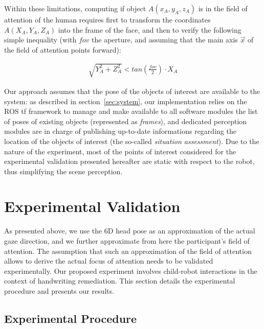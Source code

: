 \documentclass{sig-alternate}
\begin{document}
Within these limitations, computing if object $A(x_A,y_A,z_A)$ is in the field
of attention of the human requires first to transform the coordinates
$A(X_A,Y_A,Z_A)$ into the frame of the face, and then to verify the following
simple inequality (with $fov$ the aperture, and assuming that the main axis
$\vec{x}$ of the field of attention points forward):

\begin{align}
    \sqrt{Y_A^2 + Z_A^2} < tan\left(\frac{fov}{2}\right) \cdot X_A
\label{eq:fov}
\end{align}

Our approach assumes that the pose of the objects of interest are available to
the system: as described in section~\ref{sec:system}, our implementation relies
on the ROS {\sc tf} framework to manage and make available to all software
modules the list of poses of existing objects (represented as {\it frames}), and
dedicated perception modules are in charge of publishing up-to-date informations
regarding the location of the objects of interest (the so-called \emph{situation
assessment}). Due to the nature of the experiment, most of the points of
interest considered for the experimental validation presented hereafter are
static with respect to the robot, thus simplifying the scene perception.


\section{Experimental Validation}
\label{sec:expe}

As presented above, we use the 6D head pose as an approximation of the actual
gaze direction, and we further approximate from here the participant's field of
attention. The assumption that such an approximation of the field of attention
allows to derive the actual focus of attention needs to be validated
experimentally.  Our proposed experiment involves child-robot interactions in
the context of handwriting remediation.  This section details the experimental
procedure and presents our results.


\subsection{Experimental Procedure}
\end{document}
